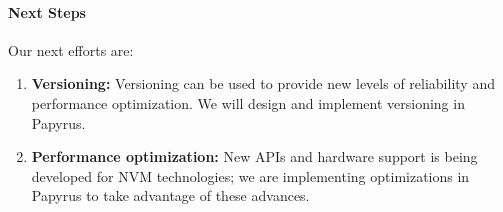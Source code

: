 \paragraph{Next Steps}
Our next efforts are:

\begin{enumerate}
\item \textbf{Versioning: } Versioning can be used to provide new levels of reliability and performance optimization. We will design and implement versioning in Papyrus.

\item \textbf{Performance optimization:} New APIs and hardware support is being developed for NVM technologies; we are implementing optimizations in Papyrus to take advantage of these advances.

\end{enumerate}